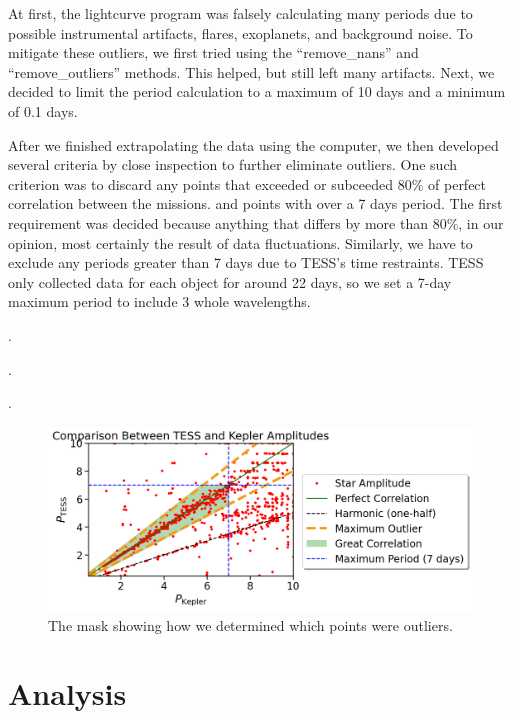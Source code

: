 \documentclass[modern]{aastex631}
\begin{document}
At first, the lightcurve program was falsely calculating many periods due to possible instrumental artifacts, flares, exoplanets, and background noise. To mitigate these outliers, we first tried using the \enquote{remove\_nans} and \enquote{remove\_outliers} methods. This helped, but still left many artifacts. Next, we decided to limit the period calculation to a maximum of 10 days and a minimum of 0.1 days.

After we finished extrapolating the data using the computer, we then developed several criteria by close inspection to further eliminate outliers. One such criterion was to discard any points that exceeded or subceeded 80\% of perfect correlation between the missions. and points with over a 7 days period. The first requirement was decided because anything that differs by more than 80\%, in our opinion, most certainly the result of data fluctuations. Similarly, we have to exclude any periods greater than 7 days due to TESS's time restraints. TESS only collected data for each object for around 22 days, so we set a 7-day maximum period to include 3 whole wavelengths.


.

.

.

\begin{figure}[!htb]
  \centering
  \includegraphics[scale=0.5]{Amplitude Comparison Mask.png}
  \caption{The mask showing how we determined which points were outliers.}
\end{figure}
\FloatBarrier

\section{Analysis}
\end{document}
